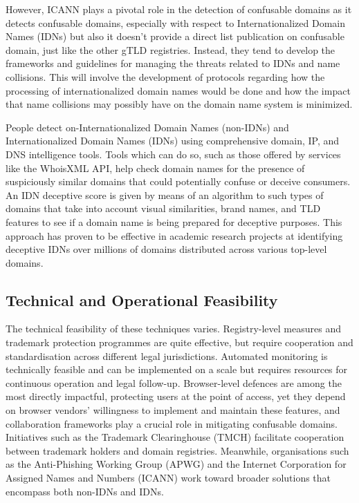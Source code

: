 However, ICANN plays a pivotal role in the detection of confusable domains as it detects confusable domains, especially with respect to Internationalized Domain Names (IDNs) but also it doesn't provide a direct list publication on confusable domain, just like the other gTLD registries. Instead, they tend to develop the frameworks and guidelines for managing the threats related to IDNs and name collisions. This will involve the development of protocols regarding how the processing of internationalized domain names would be done and how the impact that name collisions may possibly have on the domain name system is minimized. \cite{ICANNIDNs}

People detect on-Internationalized Domain Names (non-IDNs) and Internationalized Domain Names (IDNs) using comprehensive domain, IP, and DNS intelligence tools. Tools which can do so, such as those offered by services like the WhoisXML API, help check domain names for the presence of suspiciously similar domains that could potentially confuse or deceive consumers. An IDN deceptive score is given by means of an algorithm to such types of domains that take into account visual similarities, brand names, and TLD features to see if a domain name is being prepared for deceptive purposes. This approach has proven to be effective in academic research projects at identifying deceptive IDNs over millions of domains distributed across various top-level domains. \cite{WhoisXMLAPI}

\subsection{Technical and Operational Feasibility}
The technical feasibility of these techniques varies. Registry-level measures and trademark protection programmes are quite effective, but require cooperation and standardisation across different legal jurisdictions. Automated monitoring is technically feasible and can be implemented on a scale but requires resources for continuous operation and legal follow-up. Browser-level defences are among the most directly impactful, protecting users at the point of access, yet they depend on browser vendors' willingness to implement and maintain these features, and collaboration frameworks play a crucial role in mitigating confusable domains. Initiatives such as the Trademark Clearinghouse (TMCH) facilitate cooperation between trademark holders and domain registries. Meanwhile, organisations such as the Anti-Phishing Working Group (APWG) and the Internet Corporation for Assigned Names and Numbers (ICANN) work toward broader solutions that encompass both non-IDNs and IDNs.

